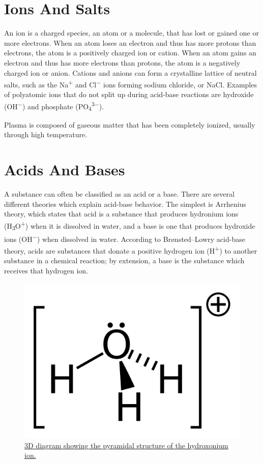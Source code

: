 \hypertarget{ions-and-salts}{%
\section{Ions And Salts}\label{ions-and-salts}}

An ion is a charged species, an atom or a molecule, that has lost or gained one or more electrons. When an atom loses an electron and thus has more protons than electrons, the atom is a positively charged ion or cation. When an atom gains an electron and thus has more electrons than protons, the atom is a negatively charged ion or anion. Cations and anions can form a crystalline lattice of neutral salts, such as the Na\textsuperscript{+} and Cl\textsuperscript{−} ions forming sodium chloride, or NaCl. Examples of polyatomic ions that do not split up during acid-base reactions are hydroxide (OH\textsuperscript{−}) and phosphate (PO\textsubscript{4}\textsuperscript{3−}).

Plasma is composed of gaseous matter that has been completely ionized, usually through high temperature.

\hypertarget{acids-and-bases}{%
\section{Acids And Bases}\label{acids-and-bases}}

A substance can often be classified as an acid or a base. There are several different theories which explain acid-base behavior. The simplest is Arrhenius theory, which states that acid is a substance that produces hydronium ions (H\textsubscript{3}O\textsuperscript{+}) when it is dissolved in water, and a base is one that produces hydroxide ions (OH\textsuperscript{−}) when dissolved in water. According to Brønsted--Lowry acid-base theory, acids are substances that donate a positive hydrogen ion (H\textsuperscript{+}) to another substance in a chemical reaction; by extension, a base is the substance which receives that hydrogen ion.



\begin{figure}

{\centering \includegraphics[width=0.7\linewidth]{./figures/chemistry/Hydroxonium-cation} 

}

\caption{\href{https://commons.wikimedia.org/wiki/File:Hydroxonium-cation.svg}{3D diagram showing the pyramidal structure of the hydroxonium ion.}}\label{fig:hydroxoniumion}
\end{figure}



